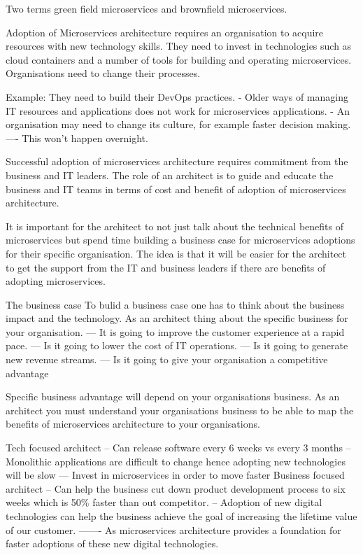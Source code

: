 \documentclass[a4paper, 11pt]{book}
\begin{document}
    Two terms green field microservices and brownfield microservices.

    Adoption of Microservices architecture requires an organisation to acquire resources with new technology skills.
    They need to invest in technologies such as cloud containers and a number of tools for building and operating microservices.
    Organisations need to change their processes.

    Example: They need to build their DevOps practices.
    - Older ways of managing IT resources and applications does not work for microservices applications.
    - An organisation may need to change its culture, for example faster decision making.
    ---- This won't happen overnight.

    Successful adoption of microservices architecture requires commitment from the business and IT leaders.
    The role of an architect is to guide and educate the business and IT teams in terms of cost and benefit of adoption of microservices architecture.

    It is important for the architect to not just talk about the technical benefits of microservices but spend time building a business case for microservices adoptions for their specific organisation.
    The idea is that it will be easier for the architect to get the support from the IT and business leaders if there are benefits of adopting microservices.

    The business case
    To bulid a business case one has to think about the business impact and the technology.
    As an architect thing about the specific business for your organisation.
    --- It is going to improve the customer experience at a rapid pace.
    --- Is it going to lower the cost of IT operations.
    --- Is it going to generate new revenue streams.
    --- Is it going to give your organisation a competitive advantage

    Specific business advantage will depend on your organisations business.
    As an architect you must understand your organisations business to be able to map the benefits of microservices architecture to your organisations.

    Tech focused architect
    -- Can release software every 6 weeks vs every 3 months
    -- Monolithic applications are difficult to change hence adopting new technologies will be slow
    --- Invest in microservices in order to move faster
    Business focused architect
    -- Can help the business cut down product development process to six weeks which is 50\% faster than out competitor.
    -- Adoption of new digital technologies can help the business achieve the goal of increasing the lifetime value of our customer.
    ------- As microservices architecture provides a foundation for faster adoptions of these new digital technologies.
\end{document}
